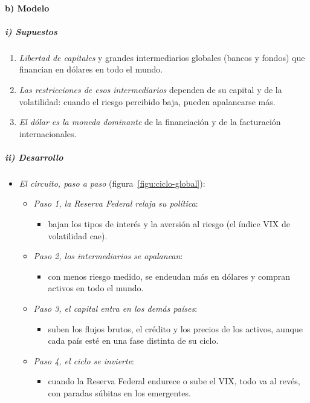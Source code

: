 \documentclass[11pt]{article}
\begin{document}
\paragraph{b) Modelo}

\subparagraph{i) Supuestos}

\begin{enumerate}
\item \emph{Libertad de capitales} y grandes intermediarios globales (bancos y fondos) que financian en dólares en todo el mundo.
\item \emph{Las restricciones de esos intermediarios} dependen de su capital y de la volatilidad: cuando el riesgo percibido baja, pueden apalancarse más.
\item \emph{El dólar es la moneda dominante} de la financiación y de la facturación internacionales.
\end{enumerate}

\subparagraph{ii) Desarrollo}

\begin{itemize}
\item \emph{El circuito, paso a paso} (figura~\ref{figu:ciclo-global}):
  \begin{itemize}
  \item \emph{Paso 1, la Reserva Federal relaja su política}:
    \begin{itemize}
    \item bajan los tipos de interés y la aversión al riesgo (el índice VIX de volatilidad cae).
    \end{itemize}
  \item \emph{Paso 2, los intermediarios se apalancan}:
    \begin{itemize}
    \item con menos riesgo medido, se endeudan más en dólares y compran activos en todo el mundo.
    \end{itemize}
  \item \emph{Paso 3, el capital entra en los demás países}:
    \begin{itemize}
    \item suben los flujos brutos, el crédito y los precios de los activos, aunque cada país esté en una fase distinta de su ciclo.
    \end{itemize}
  \item \emph{Paso 4, el ciclo se invierte}:
    \begin{itemize}
    \item cuando la Reserva Federal endurece o sube el VIX, todo va al revés, con paradas súbitas en los emergentes.
    \end{itemize}
  \end{itemize}
\end{itemize}
\end{document}
